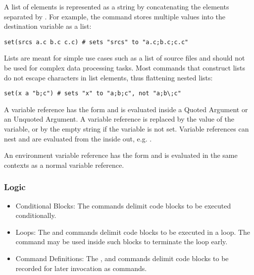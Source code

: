 A list of elements is represented as a string by concatenating the elements separated by \inlinecode{;}. For example, the  command stores multiple values into the destination variable as a list:
\begin{lstlisting}
set(srcs a.c b.c c.c) # sets "srcs" to "a.c;b.c;c.c"
\end{lstlisting}
Lists are meant for simple use cases such as a list of source files and should not be used for complex data processing tasks. Most commands that construct lists do not escape \inlinecode{;} characters in list elements, thus flattening nested lists:
\begin{lstlisting}
set(x a "b;c") # sets "x" to "a;b;c", not "a;b\;c"
\end{lstlisting}


A variable reference has the form  and is evaluated inside a Quoted Argument or an Unquoted Argument. A variable reference is replaced by the value of the variable, or by the empty string if the variable is not set. Variable references can nest and are evaluated from the inside out, e.g. .

An environment variable reference has the form  and is evaluated in the same contexts as a normal variable reference.

\subsubsection{Logic}
\begin{itemize}
    \item Conditional Blocks: The  commands delimit code blocks to be executed conditionally.
    \item Loops: The  and  commands delimit code blocks to be executed in a loop. The  command may be used inside such blocks to terminate the loop early.
    \item Command Definitions: The , and  commands delimit code blocks to be recorded for later invocation as commands.
\end{itemize}


